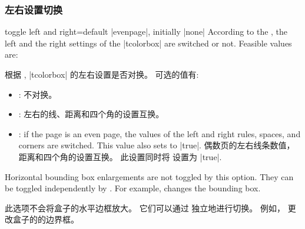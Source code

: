 \subsubsection{左右设置切换}
\begin{docTcbKey}[][doc updated=2017-02-16]{toggle left and right}{=}{default |evenpage|, initially |none|}
  According to the , the left and the right settings
  of the |tcolorbox| are switched or not. Feasible values are:

根据 , |tcolorbox| 的左右设置是否对换。 可选的值有:
  \begin{itemize}
  \item{}: %
不对换。
  \item{}: %
左右的线、距离和四个角的设置互换。
  \item{}: 
  if the page is an even page, the values of the left and
    right rules, spaces, and corners are switched. This value also sets
     to |true|.
偶数页的左右线条数值，距离和四个角的设置互换。 此设置同时将  设置为 |true|.
  \end{itemize}
\begin{marker}
Horizontal bounding box enlargements are not toggled by this option.
They can be toggled independently by .
For example,  changes the bounding box.

此选项不会将盒子的水平边框放大。
它们可以通过  独立地进行切换。
例如，  更改盒子的的边界框。
\end{marker}
\begin{dispListing}
\begin{tcolorbox}[enhanced,breakable,
  toggle left and right,sharp corners,
  boxrule=0mm,top=0mm,bottom=0mm,left=1mm,right=1mm,
  rightrule=1cm,colupper=blue!25!black,
  interior style={fill overzoom image=lichtspiel.jpg,fill image opacity=0.25},
  frame style={pattern=crosshatch dots light steel blue},
  overlay={%
    \begin{tcbclipframe}
    \tcbifoddpage{\coordinate (X) at ([xshift=-5mm]frame.east);}
                 {\coordinate (X) at ([xshift=5mm]frame.west);}
    \fill[shading=ball,ball color=blue!50!white,opacity=0.5] (X) circle (4mm);
    \end{tcbclipframe}}]
\lipsum[1-6]
\end{tcolorbox}
\end{dispListing}
\medskip


\end{docTcbKey}

